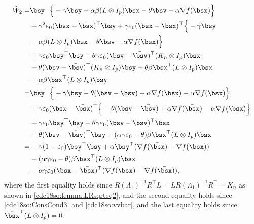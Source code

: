 \documentclass[letterpaper, 10 pt, conference]{ieeeconf}  %
\begin{document}
\begin{align}\label{cdc18so:w2dot}
\dot{W}_2=&\bsy^\top\Big\{- \gamma \bsy-\alpha\beta (L \otimes I_p)\bsx-\theta \bsv- \alpha \nabla f(\bsx)\Big\}\nonumber\\
&+\gamma^2\varepsilon_0 (\bsx-\bar{\bsx})^\top\bsy+\gamma\varepsilon_0(\bsx-\bar{\bsx})^\top \Big\{- \gamma \bsy\nonumber\\
&-\alpha\beta (L \otimes I_p)\bsx-\theta \bsv- \alpha \nabla f(\bsx)\Big\}\nonumber\\
&+\gamma\varepsilon_0\bsy^\top \bsy+\theta\gamma\varepsilon_0(\bsv-\bar{\bsv})^\top (K_n \otimes I_p)\bsx\nonumber\\
&+\theta(\bsv-\bar{\bsv})^\top (K_n\otimes I_p)\bsy+\theta\beta \bsx^\top(L\otimes I_p)\bsx\nonumber\\
&+\alpha\beta \bsx^\top(L\otimes I_p)\bsy\nonumber\\
=&\bsy^\top\Big\{- \gamma \bsy- \theta (\bsv-\bar{\bsv})
+\alpha \nabla f(\bar{\bsx})- \alpha \nabla f(\bsx)\Big\}\nonumber\\
&+\gamma\varepsilon_0(\bsx-\bar{\bsx})^\top \Big\{
- \theta (\bsv-\bar{\bsv})+\alpha \nabla f(\bar{\bsx})- \alpha \nabla f(\bsx)\Big\}\nonumber\\
&+\gamma\varepsilon_0\bsy^\top \bsy+\theta\gamma\varepsilon_0(\bsv-\bar{\bsv})^\top \bsx\nonumber\\
&+\theta(\bsv-\bar{\bsv})^\top \bsy-(\alpha\gamma\varepsilon_0-\theta)\beta \bsx^\top(L\otimes I_p)\bsx\nonumber\\
=&-\gamma(1-\varepsilon_0)\bsy^\top \bsy+\alpha \bsy^\top(\nabla f(\bar{\bsx})-\nabla f(\bsx))\nonumber\\
&-(\alpha\gamma\varepsilon_0-\theta)\beta \bsx^\top(L\otimes I_p)\bsx\nonumber\\
&-\alpha\gamma\varepsilon_0 (\bsx-\bar{\bsx})^\top(\nabla f(\bsx)-\nabla f(\bar{\bsx})),
\end{align}
where the first equality holds since $R(\Lambda_1)^{-1}R^\top L=LR(\Lambda_1)^{-1}R^\top=K_n$ as shown in \eqref{cdc18so:lemma:LRsqrteq2}, and the second equality holds since \eqref{cdc18so:ConsCond3} and \eqref{cdc18so:vvbar}, and the last equality holds since $\bar{\bsx}^\top(L \otimes I_p)=0$.
\end{document}
